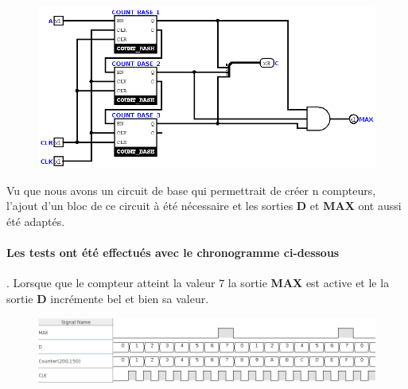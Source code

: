 \documentclass[a4paper]{article} %
\begin{document}
\begin{tcolorbox}[colframe=Monokaimagenta,colback=white]

\begin{figure}[H]
\centering
    \includegraphics[width=1\textwidth]{src/COUNT_8BITS.png}
    \label{fig:count4bits}
\end{figure}

Vu que nous avons un circuit de base qui permettrait de créer n compteurs, l'ajout d'un bloc de ce circuit à été nécessaire et les sorties \textbf{D} et \textbf{MAX} ont aussi été adaptés.

\paragraph{Les tests ont été effectués avec le chronogramme ci-dessous}. Lorsque que le compteur atteint la valeur $7$ la sortie \textbf{MAX} est active et le la sortie \textbf{D} incrémente bel et bien sa valeur.
\begin{figure}[H]
\centering
    \includegraphics[width=1\textwidth]{src/chrono_COUNT_8.png}
    \label{fig:count8bits}
\end{figure}

\end{tcolorbox}
\pagebreak
\end{document}
